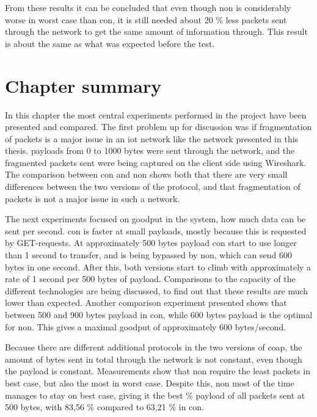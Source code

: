 \noindent From these results it can be concluded that even though \gls{non} is considerably worse in worst case than \gls{con}, it is still needed about 20 \% less packets sent through the network to get the same amount of information through. This result is about the same as what was expected before the test. 



\section{Chapter summary}

\noindent In this chapter the most central experiments performed in the project have been presented and compared. The first problem up for discussion was if fragmentation of packets is a major issue in an \gls{iot} network like the network presented in this thesis. \Glspl{payload} from 0 to 1000 bytes were sent through the network, and the fragmented packets sent were being captured on the client side using Wireshark. The comparison between \gls{con} and \gls{non} shows both that there are very small differences between the two versions of the protocol, and that fragmentation of packets is not a major issue in such a network. 

\noindent The next experiments focused on \gls{goodput} in the system, how much data can be sent per second. \gls{con} is faster at small \glspl{payload}, mostly because this is requested by GET-requests. At approximately 500 bytes \gls{payload} \gls{con} start to use longer than 1 second to transfer, and is being bypassed by \gls{non}, which can send 600 bytes in one second. After this, both versions start to climb with approximately a rate of 1 second per 500 bytes of \gls{payload}. Comparisons to the capacity of the different technologies are being discussed, to find out that these results are much lower than expected. Another comparison experiment presented shows that between 500 and 900 bytes \gls{payload} in \gls{con}, while 600 bytes \gls{payload} is the optimal for \gls{non}. This gives a maximal \gls{goodput} of approximately 600 bytes/second. 

\noindent Because there are different additional protocols in the two versions of \gls{coap}, the amount of bytes sent in total through the network is not constant, even though the \gls{payload} is constant. Measurements show that \gls{non} require the least packets in best case, but also the most in worst case. Despite this, \gls{non} most of the time manages to stay on best case, giving it the best \% payload of all packets sent at 500 bytes, with 83,56 \% compared to 63,21 \% in \gls{con}.   


